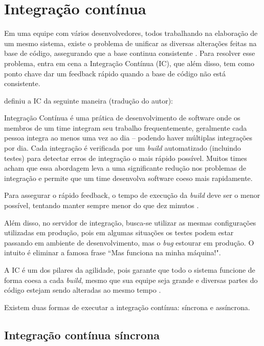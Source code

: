 \section{Integração contínua} %
\label{sec:integracao_continua}

Em uma equipe com vários desenvolvedores, todos trabalhando na elaboração de um mesmo sistema, existe o problema de unificar as diversas alterações feitas na base de código, assegurando que a base continua consistente \cite{ImproveitCI}. Para resolver esse problema, entra em cena a Integração Contínua (IC), que além disso, tem como ponto chave dar um feedback rápido quando a base de código não está consistente.

\cite{FowlerCI} definiu a IC da seguinte maneira (tradução do autor):

\begin{citacao}
Integração Contínua é uma prática de desenvolvimento de software onde os membros de um time integram seu trabalho frequentemente, geralmente cada pessoa integra ao menos uma vez ao dia – podendo haver múltiplas integrações por dia. Cada integração é verificada por um \textit{build} automatizado (incluindo testes) para detectar erros de integração o mais rápido possível. Muitos times acham que essa abordagem leva a uma significante redução nos problemas de integração e permite que um time desenvolva software coeso mais rapidamente.
\end{citacao}

Para assegurar o rápido feedback, o tempo de execução da \textit{build} deve ser o menor possível, tentando manter sempre menor do que dez minutos \cite{FowlerCI}.

Além disso, no servidor de integração, busca-se utilizar as mesmas configurações utilizadas em produção, pois em algumas situações os testes podem estar passando em ambiente de desenvolvimento, mas o \textit{bug} estourar em produção. O intuito é eliminar a famosa frase ``Mas funciona na minha máquina!".

A IC é um dos pilares da agilidade, pois garante que todo o sistema funcione de forma coesa a cada \textit{build}, mesmo que sua equipe seja grande e diversas partes do código estejam sendo alteradas ao mesmo tempo \cite{CaelumCI}.

Existem duas formas de executar a integração contínua: síncrona e assíncrona.

\subsection{Integração contínua síncrona} %
\label{sub:integracao_continua_sincrona}

